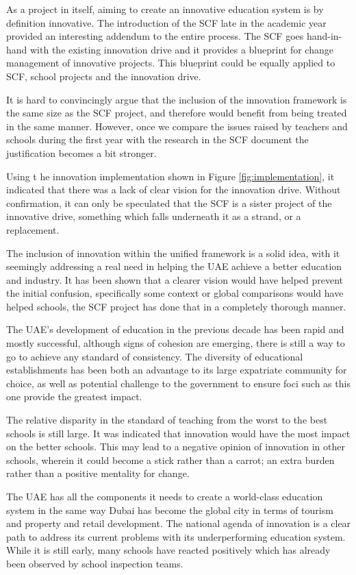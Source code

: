 \documentclass[11pt]{article}
\begin{document}
As a project in itself, aiming to create an innovative education system is by definition innovative. The introduction of the SCF late in the academic year provided an interesting addendum to the entire process. The SCF goes hand-in-hand with the existing innovation drive and it provides a blueprint for change management of innovative projects. This blueprint could be equally applied to SCF, school projects and the innovation drive.

It is hard to convincingly argue that the inclusion of the innovation framework is the same size as the SCF project, and therefore would benefit from being treated in the same manner. However, once we compare the issues raised by teachers and schools during the first year with the research in the SCF document the justification becomes a bit stronger.

Using t	he innovation implementation shown in Figure \ref{fig:implementation}, it indicated that there was a lack of clear vision for the innovation drive. Without confirmation, it can only be speculated that the SCF is a sister project  of the innovative drive, something which falls underneath it as a strand, or a replacement.

The inclusion of innovation within the unified framework is a solid idea, with it seemingly addressing a real need in helping the UAE achieve a better education and industry. It has been shown that a clearer vision would have helped prevent the initial confusion, specifically some context or global comparisons would have helped schools, the SCF project has done that in a completely thorough manner.

The UAE's development of education in the previous decade has been rapid and mostly successful, although signs of cohesion are emerging, there is still a way to go to achieve any standard of consistency. The diversity of educational establishments has been both an advantage to its large expatriate community for choice, as well as potential challenge to the government to ensure foci such as this one provide the greatest impact.

The relative disparity in the standard of teaching from the worst to the best schools is still large. It was indicated that innovation would have the most impact on the better schools. This may lead to a negative opinion of innovation in other schools, wherein it could become a stick rather than a carrot; an extra burden rather than a positive mentality for change.

The UAE has all the components it needs to create a world-class education system in the same way Dubai has become the global city in terms of tourism and property and retail development. The national agenda of innovation is a clear path to address its current problems with its underperforming education system. While it is still early, many schools have reacted positively which has already been observed by school inspection teams.
\end{document}
